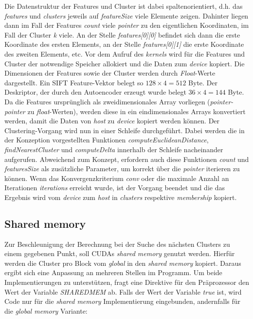 Die Datenstruktur der Features und Cluster ist dabei spaltenorientiert, d.h. das \textit{features} und \textit{clusters} jeweils auf \textit{featureSize} viele Elemente zeigen. Dahinter liegen dann im Fall der Features \textit{count} viele \textit{pointer} zu den eigentlichen Koordinaten, im Fall der Cluster \textit{k} viele. An der Stelle \textit{features[0][0]} befindet sich dann die erste Koordinate des ersten Elements, an der Stelle \textit{features[0][1]} die erste Koordinate des zweiten Elements, etc.\newline
Vor dem Aufruf des \textit{kernels} wird für die Features und Cluster der notwendige Speicher allokiert und die Daten zum \textit{device} kopiert. Die Dimensionen der Features sowie der Cluster werden durch \textit{Float}-Werte dargestellt. Ein SIFT Feature-Vektor belegt so $128 \times 4 = 512$ Byte. Der Deskriptor, der durch den Autoencoder erzeugt wurde belegt $36 \times 4 = 144$ Byte. Da die Features ursprünglich als zweidimensionales Array vorliegen (\textit{pointer-pointer} zu \textit{float}-Werten), werden diese in ein eindimensionales Arrays konvertiert werden, damit die Daten von \textit{host} zu \textit{device} kopiert werden können.\newline
Der Clustering-Vorgang wird nun in einer Schleife durchgeführt. Dabei werden die in der Konzeption vorgestellten Funktionen \textit{computeEuclideanDistance}, \textit{findNearestCluster} und \textit{computeDelta} innerhalb der Schleife nacheinander aufgerufen. Abweichend zum Konzept, erfordern auch diese Funktionen \textit{count} und \textit{featuresSize} als zusätzliche Parameter, um korrekt über die \textit{pointer} iterieren zu können.
Wenn das Konvergenzkriterium \textit{conv} oder die maximale Anzahl an Iterationen \textit{iterations} erreicht wurde, ist der Vorgang beendet und die das Ergebnis wird vom \textit{device} zum \textit{host} in \textit{clusters} respektive \textit{membership} kopiert.

\subsection{Shared memory}

Zur Beschleunigung der Berechnung bei der Suche des nächsten Clusters zu einem gegebenen Punkt, soll CUDAs \textit{shared memory} genutzt werden. Hierfür werden die Cluster pro Block vom \textit{global} in den \textit{shared memory} kopiert. Daraus ergibt sich eine Anpassung an mehreren Stellen im Programm. Um beide Implementierungen zu unterstützen, fragt eine Direktive für den Präprozessor den Wert der Variable \textit{SHARED\textunderscore MEM} ab. Falls der Wert der Variable \textit{true} ist, wird Code nur für die \textit{shared memory} Implementierung eingebunden, andernfalls für die \textit{global memory} Variante:


